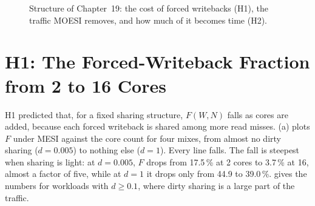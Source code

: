 \begin{figure}[htbp]
\centering
{}
\caption[]{Structure of Chapter~19: the cost of forced
writebacks (H1), the traffic MOESI removes, and how much of it becomes time (H2).}
\label{fig:ch19-map}
\end{figure}

\section{H1: The Forced-Writeback Fraction from 2 to 16 Cores}
\label{sec:res-h1}
%

H1 predicted that, for a fixed sharing structure, $F(W,N)$ falls as cores are added,
because each forced writeback is shared among more read misses.
(a) plots $F$ under MESI against the core count for four mixes, from
almost no dirty sharing ($d=0.005$) to nothing else ($d=1$). Every line falls. The
fall is steepest when sharing is light: at $d=0.005$, $F$ drops from 17.5\,\% at 2
cores to 3.7\,\% at 16, almost a factor of five, while at $d=1$ it drops only from
44.9 to 39.0\,\%.  gives the numbers for workloads with
$d\ge0.1$, where dirty sharing is a large part of the traffic.

